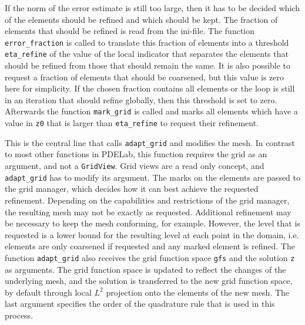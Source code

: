 \documentclass[a4paper,12pt]{article}
\begin{document}

If the norm of the error estimate is still too large, then it has to be decided which of the
elements should be refined and which should be kept. The fraction of elements that should be
refined is read from the ini-file. The function \lstinline{error_fraction} is called to
translate this fraction of elements into a threshold \lstinline{eta_refine} of the value of
the local indicator that separates the elements that should be refined from those that should
remain the same. It is also possible to request a fraction of elements that should be
coarsened, but this value is zero here for simplicity. If the chosen fraction contains all
elements or the loop is still in an iteration that should refine globally, then this
threshold is set to zero. Afterwards the function \lstinline{mark_grid} is called and marks
all elements which have a value in \lstinline{z0} that is larger than \lstinline{eta_refine}
to request their refinement.


This is the central line that calls \lstinline{adapt_grid} and modifies the mesh. In contrast
to most other functions in PDELab, this function requires the grid as an argument, and not a
\lstinline{GridView}. Grid views are a read only concept, and \lstinline{adapt_grid} has to
modify its argument. The marks on the elements are passed to the grid manager, which decides
how it can best achieve the requested refinement. Depending on the capabilities and
restrictions of the grid manager, the resulting mesh may not be exactly as requested.
Additional refinement may be necessary to keep the mesh conforming, for example. However, the
level that is requested is a lower bound for the resulting level at each point in the domain,
i.e. elements are only coarsened if requested and any marked element is refined. The function
\lstinline{adapt_grid} also receives the grid function space \lstinline{gfs} and the solution
\lstinline{z} as arguments. The grid function space is updated to reflect the changes of the
underlying mesh, and the solution is transferred to the new grid function space, by default
through local $L^2$ projection onto the elements of the new mesh. The last argument specifies
the order of the quadrature rule that is used in this process.
\end{document}
